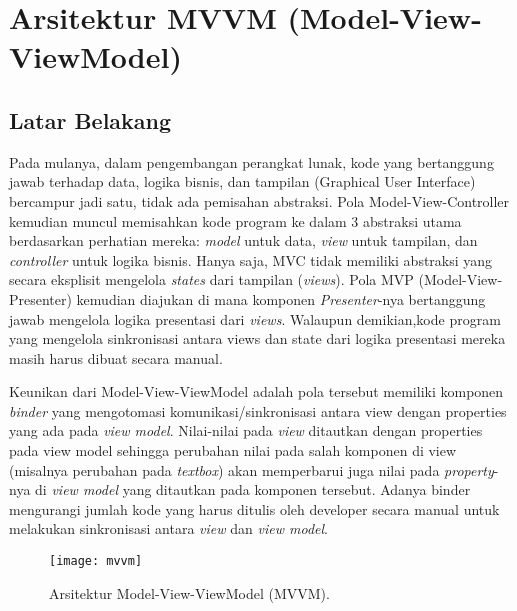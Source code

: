 \chapter{Arsitektur MVVM (Model-View-ViewModel)}

\section{Latar Belakang}
Pada mulanya, dalam pengembangan perangkat lunak, kode yang bertanggung jawab terhadap data, logika bisnis, dan tampilan (Graphical User Interface) bercampur jadi satu, tidak ada pemisahan abstraksi.
Pola Model-View-Controller kemudian muncul memisahkan kode program ke dalam 3 abstraksi utama berdasarkan perhatian mereka: \textit{model} untuk data, \textit{view} untuk tampilan, dan \textit{controller} untuk logika bisnis. 
Hanya saja, MVC tidak memiliki abstraksi yang secara eksplisit mengelola \textit{states} dari tampilan (\textit{views}).
Pola MVP (Model-View-Presenter) kemudian diajukan di mana komponen \textit{Presenter}-nya bertanggung jawab mengelola logika presentasi dari \textit{views}. Walaupun demikian,kode program yang mengelola sinkronisasi antara views dan state dari logika presentasi mereka masih harus dibuat secara manual.

Keunikan dari Model-View-ViewModel adalah pola tersebut memiliki komponen \textit{binder} yang mengotomasi komunikasi/sinkronisasi antara view dengan properties yang ada pada \textit{view model}. Nilai-nilai pada \textit{view} ditautkan dengan properties pada view model sehingga perubahan nilai pada salah komponen di view (misalnya perubahan pada \textit{textbox}) akan memperbarui juga nilai pada \textit{property}-nya di \textit{view model} yang ditautkan pada komponen tersebut. Adanya binder mengurangi jumlah kode yang harus ditulis oleh developer secara manual untuk melakukan sinkronisasi antara \textit{view} dan \textit{view model}.

\begin{figure}[h]
    \centering
    \texttt{[image: mvvm]}
    \caption{Arsitektur Model-View-ViewModel (MVVM).}
    \label{fig:mvvm}
\end{figure}


